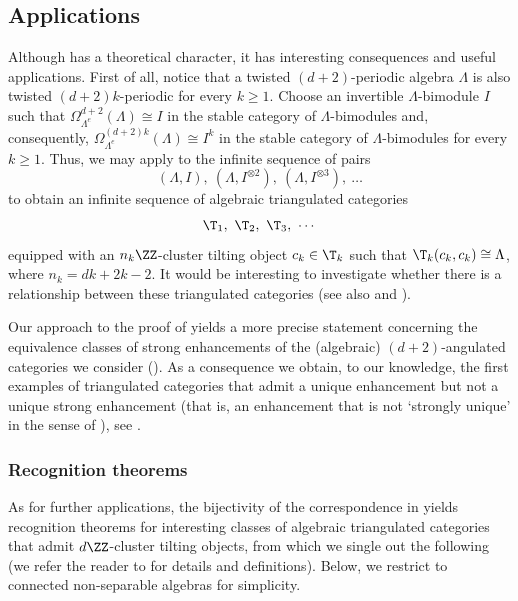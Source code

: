 \documentclass[a4paper]{amsart}
\begin{document}
\subsection*{Applications}

Although  has a theoretical character, it
has interesting consequences and useful applications. First of all, notice that
a twisted $(d+2)$-periodic algebra $\Lambda$ is also twisted $(d+2)k$-periodic
for every $k\geq1$. Choose an invertible $\Lambda$-bimodule $I$ such that
$\Omega_{\Lambda^e}^{d+2}(\Lambda)\cong I$ in the stable category of
$\Lambda$-bimodules and, consequently,
$\Omega_{\Lambda^e}^{(d+2)k}(\Lambda)\cong I^k$ in the stable category of
$\Lambda$-bimodules for every $k\geq1$. Thus, we may apply
 to the infinite sequence of pairs
\[
  (\Lambda,I),\ (\Lambda,I^{\otimes 2}),\ (\Lambda,I^{\otimes 3}),\ \dots
\]
to obtain an infinite sequence of algebraic triangulated categories
\[
  \T_1,\ \T_2,\ \T_3,\ \cdots
\]
equipped with an $n_k\ZZ$-cluster tilting object $c_k\in\T_k$ such that
$\T_k(c_k,c_k)\cong\Lambda$, where $n_k=dk+2k-2$. It would be interesting to
investigate whether there is a relationship between these triangulated
categories (see also  and
).

Our approach to the proof of  yields a
more precise statement concerning the equivalence classes of strong enhancements
of the (algebraic) $(d+2)$-angulated categories we consider
(). As a consequence we obtain, to our
knowledge, the first examples of triangulated categories that admit a unique
enhancement but not a unique strong enhancement (that is, an enhancement that is
not `strongly unique' in the sense of \cite{LO10}), see
.

\subsubsection*{Recognition theorems}

As for further applications, the bijectivity of the correspondence in
 yields recognition theorems for
interesting classes of algebraic triangulated categories that admit
$d\ZZ$-cluster tilting objects, from which we single out the following (we refer
the reader to  for details and definitions). Below,
we restrict to connected non-separable algebras for simplicity.
\end{document}
